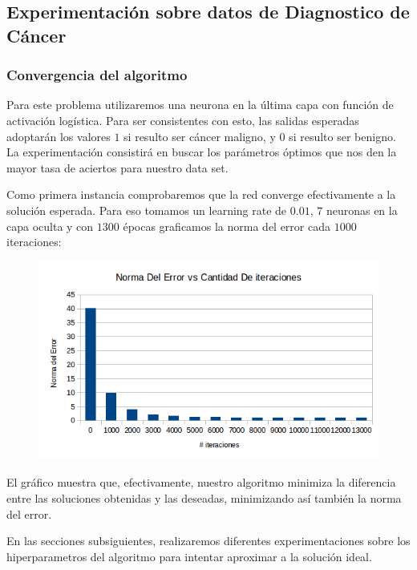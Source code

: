 \subsection{Experimentación sobre datos de Diagnostico de Cáncer}

\subsubsection{Convergencia del algoritmo} 


Para este problema utilizaremos una neurona en la última capa con función de activación logística. Para ser consistentes con esto, las salidas esperadas adoptarán los valores $1$ si resulto ser cáncer maligno, y $0$ si resulto ser benigno. La experimentación consistirá en buscar los parámetros óptimos que nos den la mayor tasa de aciertos para nuestro data set.

Como primera instancia comprobaremos que la red converge efectivamente a la solución esperada. Para eso tomamos un learning rate de $0.01$, $7$ neuronas en la capa oculta y con $1300$ épocas graficamos la norma del error cada $1000$ iteraciones:

\begin{figure}[h!]
  \centering
    \includegraphics[scale=0.4]{ej1/convergencia.png}
\end{figure}

El gráfico muestra que, efectivamente, nuestro algoritmo minimiza la diferencia entre las soluciones obtenidas y las deseadas, minimizando así también la norma del error.

En las secciones subsiguientes, realizaremos diferentes experimentaciones sobre los hiperparametros del algoritmo para intentar aproximar a la solución ideal.


